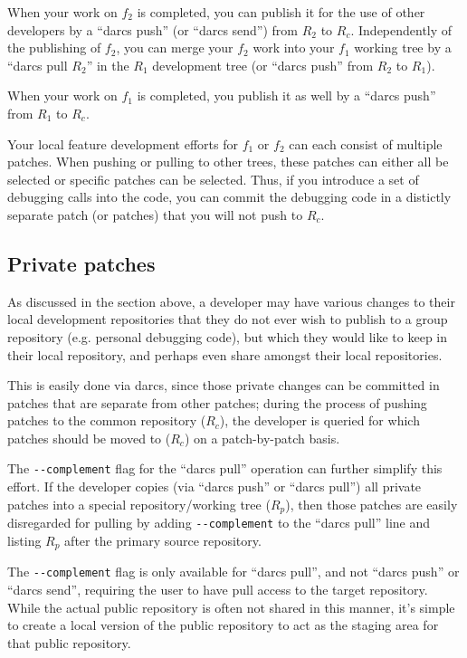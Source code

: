 When your work on $f_2$ is completed, you can publish it for the use
of other developers by a ``darcs push'' (or ``darcs send'') from $R_2$
to $R_c$.  Independently of the publishing of $f_2$, you can merge
your $f_2$ work into your $f_1$ working tree by a ``darcs pull $R_2$''
in the $R_1$ development tree (or ``darcs push'' from $R_2$ to $R_1$).

When your work on $f_1$ is completed, you publish it as well by a
``darcs push'' from $R_1$ to $R_c$.  

Your local feature development efforts for $f_1$ or $f_2$ can each
consist of multiple patches.  When pushing or pulling to other trees,
these patches can either all be selected or specific patches can be
selected.  Thus, if you introduce a set of debugging calls into the
code, you can commit the debugging code in a distictly separate patch
(or patches) that you will not push to $R_c$.

\subsection{Private patches}

As discussed in the section above, a developer may have various
changes to their local development repositories that they do not ever
wish to publish to a group repository (e.g. personal debugging code),
but which they would like to keep in their local repository, and
perhaps even share amongst their local repositories.

This is easily done via darcs, since those private changes can be
committed in patches that are separate from other patches; during the
process of pushing patches to the common repository ($R_c$), the
developer is queried for which patches should be moved to ($R_c$) on a
patch-by-patch basis.

The \verb!--complement! flag for the ``darcs pull'' operation can
further simplify this effort.  If the developer copies (via ``darcs
push'' or ``darcs pull'') all private patches into a special
repository/working tree ($R_p$), then those patches are easily
disregarded for pulling by adding \verb!--complement! to the ``darcs
pull'' line and listing $R_p$ after the primary source repository.

The \verb!--complement! flag is only available for ``darcs pull'', and
not ``darcs push'' or ``darcs send'', requiring the user to have pull
access to the target repository.  While the actual public repository
is often not shared in this manner, it's simple to create a local
version of the public repository to act as the staging area for that
public repository.

